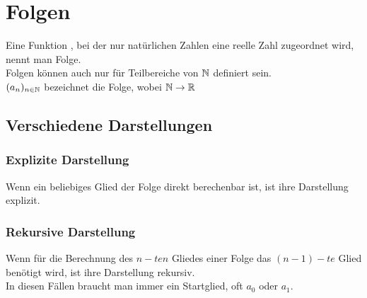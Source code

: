 \chapter{Folgen}

Eine Funktion , bei der nur natürlichen Zahlen eine reelle Zahl zugeordnet wird, nennt man Folge.\\
Folgen können auch nur für Teilbereiche von $\mathbb{N}$ definiert sein.\\
$(a_{n})_{n\in\mathbb{N}}$ bezeichnet die Folge, wobei $\mathbb{N}\rightarrow\mathbb{R}$\\


		\section{Verschiedene Darstellungen}


	\subsection{Explizite Darstellung}

Wenn ein beliebiges Glied der Folge direkt berechenbar ist, ist ihre Darstellung explizit.


	\subsection{Rekursive Darstellung}

Wenn für die Berechnung des $n-ten$ Gliedes einer Folge das $(n-1)-te$ Glied benötigt wird, ist ihre Darstellung rekursiv.\\
In diesen Fällen braucht man immer ein Startglied, oft $a_{0}$ oder $ a_{1}$.


